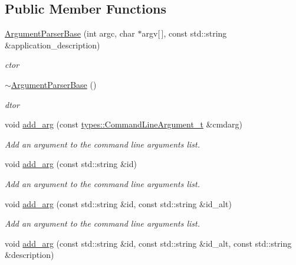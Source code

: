 \subsection*{Public Member Functions}
\begin{DoxyCompactItemize}
\item 
\hyperlink{classcppargparse_1_1parser_1_1ArgumentParserBase_a91c5c101e21966fb8c04c094b04b8ba3}{Argument\+Parser\+Base} (int argc, char $\ast$argv\mbox{[}$\,$\mbox{]}, const std\+::string \&application\+\_\+description)
\begin{DoxyCompactList}\small\item\em c\textquotesingle{}tor \end{DoxyCompactList}\item 
\hyperlink{classcppargparse_1_1parser_1_1ArgumentParserBase_a160867551ad33fceb69f9e920e3e4c23}{$\sim$\+Argument\+Parser\+Base} ()
\begin{DoxyCompactList}\small\item\em d\textquotesingle{}tor \end{DoxyCompactList}\item 
void \hyperlink{classcppargparse_1_1parser_1_1ArgumentParserBase_a2e1cc11e023a40d31881832331faa4b3}{add\+\_\+arg} (const \hyperlink{structcppargparse_1_1types_1_1CommandLineArgument__t}{types\+::\+Command\+Line\+Argument\+\_\+t} \&cmdarg)
\begin{DoxyCompactList}\small\item\em Add an argument to the command line arguments list. \end{DoxyCompactList}\item 
void \hyperlink{classcppargparse_1_1parser_1_1ArgumentParserBase_a020029da2da0147df81342a146a521b2}{add\+\_\+arg} (const std\+::string \&id)
\begin{DoxyCompactList}\small\item\em Add an argument to the command line arguments list. \end{DoxyCompactList}\item 
void \hyperlink{classcppargparse_1_1parser_1_1ArgumentParserBase_a462c869315ff172aa7d02b45098b3e02}{add\+\_\+arg} (const std\+::string \&id, const std\+::string \&id\+\_\+alt)
\begin{DoxyCompactList}\small\item\em Add an argument to the command line arguments list. \end{DoxyCompactList}\item 
void \hyperlink{classcppargparse_1_1parser_1_1ArgumentParserBase_a229555ad90f83f43c6e0915d69c2b941}{add\+\_\+arg} (const std\+::string \&id, const std\+::string \&id\+\_\+alt, const std\+::string \&description)

\end{DoxyCompactItemize}
